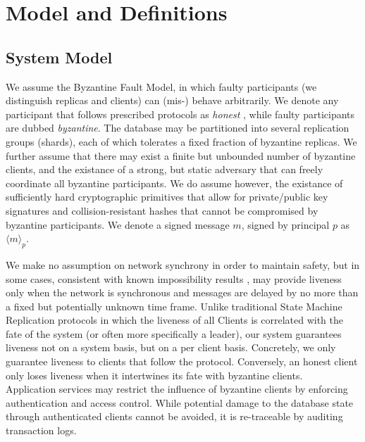 \section{Model and Definitions}


\subsection{System Model}
We assume the Byzantine Fault Model, in which faulty participants (we distinguish replicas and clients) can (mis-) behave arbitrarily. We denote any participant that follows prescribed protocols as \textit{honest} , while faulty participants are dubbed \textit{byzantine}. The database may be partitioned into several replication groups (shards), each of which tolerates a fixed fraction of byzantine replicas. We further assume that there may exist a finite but unbounded number of byzantine clients, and the existance of a strong, but static adversary that can freely coordinate all byzantine participants. We do assume however, the existance of sufficiently hard cryptographic primitives that allow for private/public key signatures and collision-resistant hashes that cannot be compromised by byzantine participants. We denote a signed message $m$, signed by principal $p$ as $\langle m \rangle_p$. 
 
We make no assumption on network synchrony in order to maintain safety, but in some cases, consistent with known impossibility results \cite{fischer1985impossibility}, may provide liveness only when the network is synchronous and messages are delayed by no more than a fixed but potentially unknown time frame. 
Unlike traditional State Machine Replication protocols in which the liveness of all Clients is correlated with the fate of the system (or often more specifically a leader), our system guarantees liveness not on a system basis, but on a per client basis. Concretely, we only guarantee liveness to clients that follow the protocol. Conversely, an honest client only loses liveness when it intertwines its fate with byzantine clients.\\

Application services may restrict the influence of byzantine clients by enforcing authentication and access control. While potential damage to the database state through authenticated clients cannot be avoided, it is re-traceable by auditing transaction logs.\\
